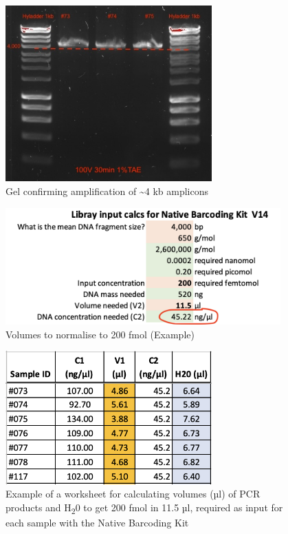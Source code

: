 \documentclass[
]{book}
\begin{document}
\hfill\break

\begin{figure}
\centering
\includegraphics[width=3.125in,height=\textheight]{./img/PCR_gel.jpg}
\caption{Gel confirming amplification of \textasciitilde4 kb amplicons}
\end{figure}

\hfill\break

\begin{figure}
\centering
\includegraphics[width=4.16667in,height=\textheight]{./img/PCR_minDNA.png}
\caption{Volumes to normalise to 200 fmol (Example)}
\end{figure}

\hfill\break

\begin{figure}
\centering
\includegraphics[width=3.125in,height=\textheight]{./img/PCR_C1V1.png}
\caption{Example of a worksheet for calculating volumes (µl) of PCR products and H\textsubscript{2}0 to get 200 fmol in 11.5 µl, required as input for each sample with the Native Barcoding Kit}
\end{figure}
\end{document}
